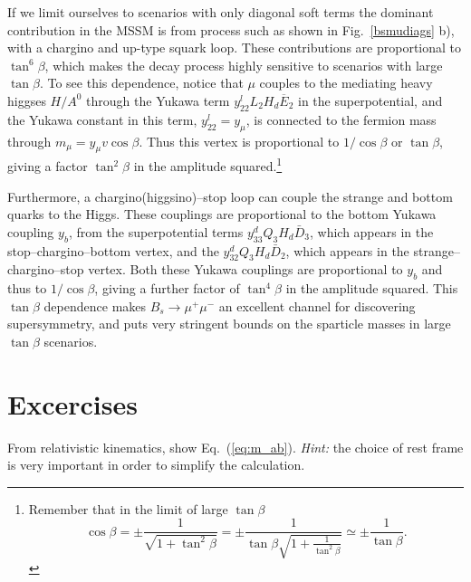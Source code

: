 \documentclass[notes.tex]{subfiles}
\begin{document}
If we limit ourselves to scenarios with only diagonal soft terms the dominant contribution in the MSSM is from process such as shown in Fig.~\ref{bsmudiags} b), with a chargino and up-type squark loop. These contributions are proportional to $\tan^6\beta$, which makes the decay process highly sensitive to scenarios with large $\tan\beta$. To see this dependence, notice that $\mu$ couples to the mediating heavy higgses $H/A^0$ through the Yukawa term $y^l_{22} L_2 H_d \overline{E}_2$ in the superpotential, and the Yukawa constant in this term, $y^l_{22} = y_\mu$, is connected to the fermion mass through $m_\mu = y_\mu v\cos\beta$. Thus this vertex is proportional to $1/\cos\beta$ or $\tan\beta$, giving a factor $\tan^2\beta$ in the amplitude squared.\footnote{Remember that in the limit of large $\tan\beta$
\begin{equation}
\cos\beta= \pm \frac{1}{\sqrt{1+\tan^2\beta}}= \pm \frac{1}{\tan\beta\sqrt{1+\frac{1}{\tan^2\beta}}}\simeq\pm \frac{1}{\tan\beta}.
\end{equation}
}

Furthermore, a chargino(higgsino)--stop loop can couple the strange and bottom quarks to the Higgs. These couplings are proportional to the bottom Yukawa coupling $y_b$, from the superpotential terms $y_{33}^dQ_3H_d\bar D_3$, which appears in the stop--chargino--bottom vertex, and the  $y_{32}^dQ_3H_d\bar D_2$, which appears in the strange--chargino--stop vertex. Both these Yukawa couplings are proportional to $y_b$ and thus to  $1/\cos\beta$, giving a further factor of $\tan^4\beta$ in the amplitude squared. This $\tan\beta$ dependence makes $B_s \to \mu^+\mu^-$ an excellent channel for  discovering supersymmetry, and puts very stringent bounds on the sparticle masses in large $\tan\beta$ scenarios.



\section{Excercises}

\begin{Exercise}[]
From relativistic kinematics, show Eq.~(\ref{eq:m_ab}). {\it Hint:} the choice of rest frame is very important in order to simplify the calculation.
\end{Exercise}
\end{document}
